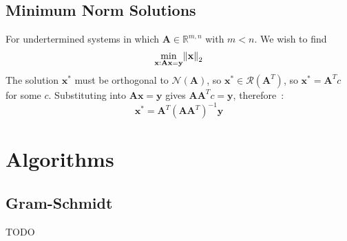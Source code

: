 \documentclass{book}
\newcommand{\mA}{\mathbf{A}}
\newcommand{\vx}{\mathbf{x}}
\newcommand{\vy}{\mathbf{y}}
\newcommand{\sRmn}{\mathbb{R}^{m,n}}
\newcommand{\ns}{\mathcal{N}}
\newcommand{\range}{\mathcal{R}}
\begin{document}
\section{Minimum Norm Solutions}
\label{sec:minimum-norm}
For undertermined systems in which $\mA\in\sRmn$ with $m<n$. We wish to find
\begin{equation}
\min_{\vx: \mA\vx=\vy} \norm{\vx}_2
\end{equation}
The solution $\vx^*$ must be orthogonal to $\ns(\mA)$, so $\vx^*\in\range(\mA^T)$, so $\vx^*=\mA^Tc$ for some $c$. Substituting into $\mA\vx=\vy$ gives $\mA \mA^T c=\vy$, therefore~\citep[p.\ 162]{Calafiore2014}:
\begin{equation}
\vx^*=\mA^T(\mA\mA^T)^{-1}\vy
\end{equation}













\chapter{Algorithms}

\section{Gram-Schmidt}
TODO

\end{document}
